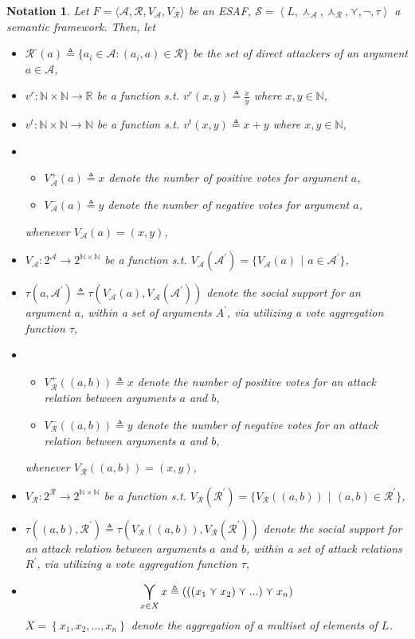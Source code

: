\documentclass{article}
\newtheorem{notation}{Notation}
\newcommand{\nat}{\mathbb{N}}   %
\newcommand{\real}{\mathbb{R}}  %
\newcommand{\args}{\mathcal{A}} %
\newcommand{\att}{\mathcal{R}}  %
\newcommand{\valueset}{L}
\newcommand{\varg}{V_{\args}}   %
\newcommand{\vargpro}[1]{\varg^+\left(#1\right)} %
\newcommand{\vargcon}[1]{\varg^-\left(#1\right)} %
\newcommand{\vatt}{V_{\att}}   %
\newcommand{\vattpro}[1]{\vatt^+\left(#1\right)} %
\newcommand{\vattcon}[1]{\vatt^-\left(#1\right)} %
\newcommand{\attackers}[1]{\att^\text{-}\left(#1\right)}
\newcommand{\safid}{F}               %
\newcommand{\saf}{\safid = \safbody} %
\newcommand{\safbody}{\langle \args, \att, \varg, \vatt \rangle} %
\newcommand{\sembodyNew}{\left\langle \valueset,\SAFand_\mathcal{A}, \SAFand_\mathcal{R},\SAFor,\lnot,\tau \right\rangle} %
\newcommand{\SAFand}{\curlywedge}     %
\newcommand{\SAFor}{\curlyvee}        %
\DeclareMathOperator*{\SAFOr}{\bigcurlyvee} %
\newcommand{\sem}{\mathcal{S}}
\begin{document}
\begin{notation}
Let $\saf$ be an ESAF, $\sem = \sembodyNew$ a semantic framework. Then, let
\begin{itemize}
\item $\attackers{a} \triangleq \{a_i \in \args: (a_i, a) \in \att\}$ be the set of direct attackers of an argument $a \in \args$, 
\item $v^r: \nat \times \nat \to \real$ be a function s.t. $v^r(x, y) \triangleq \frac{x}{y}$ where $x, y \in \mathbb{N}$,
\item $v^t: \nat \times \nat \to \nat$ be a function s.t. $v^t(x, y) \triangleq x + y$ where $x, y \in \mathbb{N}$, 
\item 
\begin{itemize}
\item $\vargpro a \triangleq x$ denote the number of positive votes for argument $a$,
\item $\vargcon a \triangleq y$ denote the number of negative votes for argument $a$,
\end{itemize}
whenever $\varg (a) = (x, y)$,
\\
\item $\varg: 2^\args \to 2^{\nat \times \nat}$ be a function s.t. $\varg(\mathcal{A}^{'}) = \{\varg(a)$ $|$ $a \in \mathcal{A}^{'}\}$,
\item $\tau(a, \mathcal{A}^{'}) \triangleq \tau(V_{\mathcal{A}}(a), \varg(\mathcal{A}^{'}))$ denote the social support for an argument $a$, within a set of arguments $A^{'}$, via utilizing a vote aggregation function $\tau$,
\item
\begin{itemize}
\item $\vattpro{(a, b)} \triangleq x$ denote the number of positive votes for an attack relation between arguments  $a$ and $b$,
\item  $ \vattcon{(a, b)} \triangleq y$ denote the number of negative votes for an attack relation between arguments  $a$ and $b$,
\end{itemize}
whenever $\vatt ((a, b)) = (x, y)$,
\\
\item $\vatt: 2^\att \to 2^{\nat \times \nat}$ be a function s.t. $\vatt(\mathcal{R}^{'}) = \{\vatt((a, b))$ $|$ $(a, b) \in\mathcal{R}^{'}\}$,
\item $\tau((a, b), \mathcal{R}^{'}) \triangleq \tau(V_{\mathcal{R}}((a, b)), \vatt(\mathcal{R}^{'}))$ denote the social support for an attack relation between arguments  $a$ and $b$, within a set of attack relations $R^{'}$, via utilizing a vote aggregation function $\tau$,
\item$$\SAFOr_{x \in X} x \triangleq\left(\left(\left(  x_{1}\SAFor x_{2}\right) \SAFor...\right)\SAFor x_{n}\right)$$ $X=\left\{  x_{1},x_{2},...,x_{n}\right\}$ denote the aggregation of a multiset of elements of $\valueset$. 


\end{itemize}
\end{notation}
\end{document}
